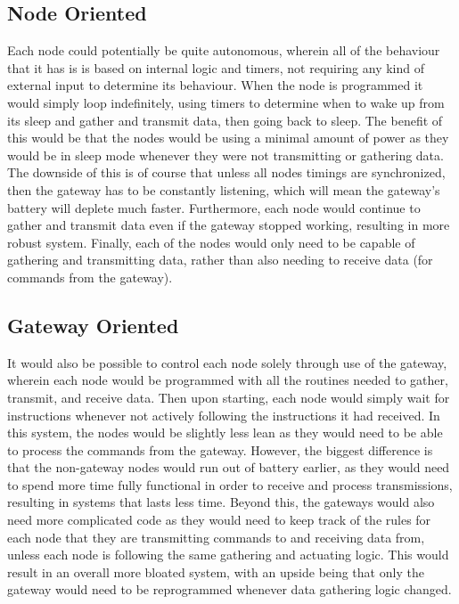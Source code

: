 \documentclass[onecolumn, draftclsnofoot,10pt, compsoc]{IEEEtran}
\begin{document}
	\subsection{Node Oriented}
	Each  node could potentially be quite autonomous, wherein all of the behaviour that it has is
	is based on internal logic and timers, not requiring any kind of external input to determine its behaviour.
	When the node is programmed it would simply loop indefinitely, using timers  to determine when to wake up
	from its sleep and gather and transmit data, then going back to sleep. The benefit of this would be that 
	the nodes would be using a minimal amount of power as they would be in sleep mode whenever they
	were not transmitting or gathering data. The downside of this is of course that unless all nodes timings are
	synchronized, then the gateway has to be constantly listening, which will mean the gateway's battery will 
	deplete much faster. Furthermore, each node would continue to gather and transmit data even if the gateway
	stopped working, resulting in more robust system. Finally, each of the nodes would only need to be capable
	of gathering and transmitting data, rather than also needing to receive data (for commands from the gateway).
	\subsection{Gateway Oriented}
	It would also be possible to control each node solely through use of the gateway, wherein each node would
	be programmed with all the routines needed to gather, transmit, and receive data. Then upon starting, each
	node would simply wait for instructions whenever not actively following the instructions it had received. 
	In this system, the nodes would be slightly less lean as they would need to be able to process the commands
	from the gateway. However, the biggest difference is that the non-gateway nodes would run out of battery earlier, as 
	they would need to spend more time fully functional in order to receive and process transmissions, 
	resulting in systems that lasts less time. Beyond this, the gateways would also need more complicated code as 
	they would need to keep track of the rules for each node that they are transmitting commands to and receiving
	data from, unless each node is following the same gathering and actuating logic. This would result in an 
	overall more bloated system, with an upside being that only the gateway would need to be reprogrammed 
	whenever data gathering logic changed. 
\end{document}
